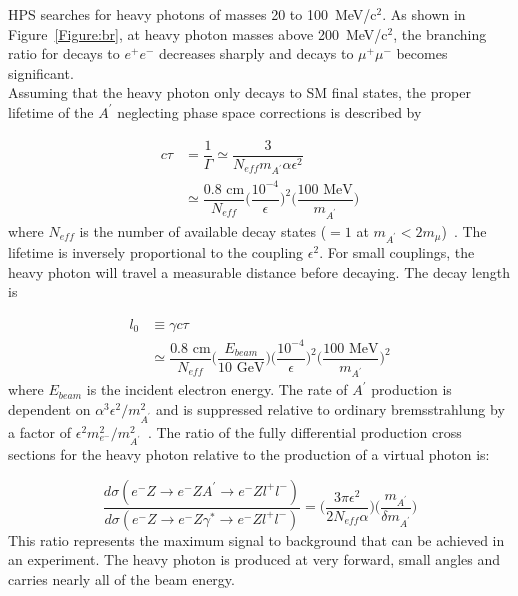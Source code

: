 HPS searches for heavy photons of masses 20 to 100~MeV/c$^2$. As shown in Figure~\ref{Figure:br}, at heavy photon masses above 200~MeV/c$^2$, the branching ratio for decays to $e^+e^-$ decreases sharply and decays to $\mu^+\mu^-$ becomes significant. \\
\indent Assuming that the heavy photon only decays to SM final states, the proper lifetime of the $A^{\prime}$ neglecting phase space corrections is described by   

\begin{equation}
	\label{eq:propLife}
	\begin{split}
	c\tau &= \dfrac{1}{\Gamma}\simeq \dfrac{3}{N_{eff}m_{A^{\prime}}\alpha\epsilon^2}\\
	&\simeq \dfrac{0.8\textrm{ cm}}{N_{eff}}\Big({\dfrac{10^{-4}}{\epsilon}}\Big)^2\Big(\dfrac{100\textrm{ MeV}}{m_{A^{\prime}}}\Big)
	\end{split}
\end{equation}
where $N_{eff}$ is the number of available decay states ($=1$ at $m_{A^{\prime}}<2m_{\mu}$)~\cite{bjorken_new_2009}. The lifetime is inversely proportional to the coupling $\epsilon^2$. For small couplings, the heavy photon will travel a measurable distance before decaying. The decay length is 

\begin{equation}
	\label{eq:decayL}
	\begin{split}
	l_0 &\equiv \gamma c \tau \\
	&\simeq \dfrac{0.8\textrm{ cm}}{N_{eff}}\Big(\dfrac{E_{beam}}{10\textrm{ GeV}}\Big)\Big({\dfrac{10^{-4}}{\epsilon}}\Big)^2\Big(\dfrac{100\textrm{ MeV}}{m_{A^{\prime}}}\Big)^2
	\end{split}
\end{equation}
where $E_{beam}$ is the incident electron energy. The rate of $A^{\prime}$ production is dependent on $\alpha^3\epsilon^2/m_{A^{\prime}}^2$ and is suppressed relative to ordinary bremsstrahlung by a factor of $\epsilon^2m_{e^-}^2/m_{A^{\prime}}^2$~\cite{bjorken_new_2009}. The ratio of the fully differential production cross sections for the heavy photon relative to the production of a virtual photon is:

\begin{equation}
	\label{eq:production}
	\dfrac{d\sigma(e^-Z\rightarrow e^-ZA^{\prime}\rightarrow e^-Zl^+l^-)}{d\sigma(e^-Z\rightarrow e^-Z\gamma^{\ast}\rightarrow e^-Zl^+l^-)} = \Big(\dfrac{3\pi\epsilon^2}{2N_{eff}\alpha}\Big) \Big(\dfrac{m_{A^{\prime}}}{\delta m_{A^{\prime}}}\Big)
\end{equation}
This ratio represents the maximum signal to background that can be achieved in an experiment. The heavy photon is produced at very forward, small angles and carries nearly all of the beam energy. \\

